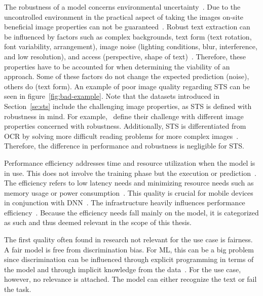 The robustness of a model concerns environmental uncertainty~\citep{ashmore_assuring_2021}.
Due to the uncontrolled environment in the practical aspect of taking the images on-site
beneficial image properties can not be guaranteed~\citep{chen_text_2021}.
Robust text extraction can be influenced by factors such as complex backgrounds, text form
(text rotation, font variability, arrangement), image noise (lighting conditions, blur,
interference, and low resolution), and access (perspective, shape of
text)~\citep{oyedotun_deep_2015,ghosh_visual_2017,chen_text_2021}.
Therefore, these properties have to be accounted for when determining the viability of an approach.
Some of these factors do not change the expected prediction (noise), others do (text
form)\cite{hu_towards_2020}.
An example of poor image quality regarding \ac{STS} can be seen in figure~\ref{fig:bad-example}.
Note that the datasets introduced in Section~\ref{se:sts} include the challenging image properties,
as \ac{STS} is defined with robustness in mind.
For example,~\cite{karatzas_icdar_2013,karatzas_icdar_2015,chng_total-text_2017} define their
challenge with different image properties concerned with robustness.
Additionally, \ac{STS} is differentiated from \ac{OCR} by solving more difficult reading problems
for more complex images~\citep{long_scene_2021,hu_gtc_2020,chen_text_2021,baek_what_2019}.
Therefore, the difference in performance and robustness is negligible for \ac{STS}.

Performance efficiency addresses time and resource utilization when the model is in use.
This does not involve the training phase but the execution or
prediction~\citep{siebert_construction_2021}.
The efficiency refers to low latency needs and minimizing resource needs such as memory
usage or power consumption~\citep{nakamichi_requirements-driven_2020, siebert_construction_2021,
sourvanos_challenges_2018}.
This quality is crucial for mobile devices in conjunction with
\ac{DNN}~\citep{sourvanos_challenges_2018, niu_26ms_2019}.
The infrastructure heavily influences performance
efficiency~\citep{nakamichi_requirements-driven_2020, siebert_construction_2021}.
Because the efficiency needs fall mainly on the model, it is categorized as such and thus deemed
relevant in the scope of this thesis.

The first quality often found in research not relevant for the use case is fairness.
A fair model is free from discrimination bias.
For \ac{ML}, this can be a big problem since discrimination can be influenced through
explicit programming in terms of the model and through implicit knowledge from the
data~\citep{vogelsang_requirements_2019}.
For the use case, however, no relevance is attached.
The model can either recognize the text or fail the task.

